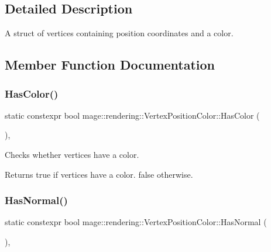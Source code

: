 \subsection{Detailed Description}
A struct of vertices containing position coordinates and a color. 

\subsection{Member Function Documentation}
\mbox{\label{structmage_1_1rendering_1_1_vertex_position_color_aea75d3acadad3cd6da04d0fc2207fc0c}} 
\subsubsection{\texorpdfstring{Has\+Color()}{HasColor()}}
{\footnotesize\ttfamily static constexpr bool mage\+::rendering\+::\+Vertex\+Position\+Color\+::\+Has\+Color (\begin{DoxyParamCaption}{ }\end{DoxyParamCaption})\hspace{0.3cm}{\ttfamily [static]}, {\ttfamily [noexcept]}}

Checks whether vertices have a color.

\begin{DoxyReturn}{Returns}
{\ttfamily true} if vertices have a color. {\ttfamily false} otherwise. 
\end{DoxyReturn}
\mbox{\label{structmage_1_1rendering_1_1_vertex_position_color_a95f2749a6f879b4123034a78c504f3c5}} 
\subsubsection{\texorpdfstring{Has\+Normal()}{HasNormal()}}
{\footnotesize\ttfamily static constexpr bool mage\+::rendering\+::\+Vertex\+Position\+Color\+::\+Has\+Normal (\begin{DoxyParamCaption}{ }\end{DoxyParamCaption})\hspace{0.3cm}{\ttfamily [static]}, {\ttfamily [noexcept]}}

